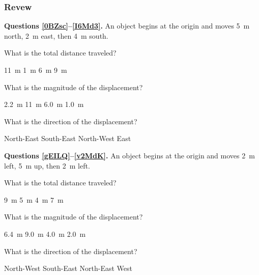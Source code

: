 \documentclass[]{exam}
\newcounter{reviewcounter}
\begin{document}
\clearpage

\subsubsection*{Revew \thereviewcounter}

\begin{questions}


\begin{EnvUplevel}
    \textbf{Questions \ref{0BZsc}--\ref{I6Md3}.} An object begins at the origin and moves \SI{5}{m} north, \SI{2}{m} east, then \SI{4}{m} south.
\end{EnvUplevel}


\question \label{0BZsc}
What is the total distance traveled?

\begin{randomizechoices}
    \correctchoice \SI{11}{m}
    \choice \SI{1}{m}
    \choice \SI{6}{m}
    \choice \SI{9}{m}
\end{randomizechoices}

\question
What is the magnitude of the displacement?

\begin{randomizechoices}
    \correctchoice \SI{2.2}{m}
    \choice \SI{11}{m}
    \choice \SI{6.0}{m}
    \choice \SI{1.0}{m}
\end{randomizechoices}

\question \label{I6Md3}
What is the direction of the displacement?

\begin{randomizechoices}
    \correctchoice North-East
    \choice South-East
    \choice North-West
    \choice East
\end{randomizechoices}

\begin{EnvUplevel}
    \textbf{Questions \ref{gEILQ}--\ref{v2MdK}.} An object begins at the origin and moves \SI{2}{m} left, \SI{5}{m} up, then \SI{2}{m} left.
\end{EnvUplevel}


\question \label{gEILQ}
What is the total distance traveled?
\begin{randomizechoices}
    \correctchoice \SI{9}{m}
    \choice \SI{5}{m}
    \choice \SI{4}{m}
    \choice \SI{7}{m}
\end{randomizechoices}

\question
What is the magnitude of the displacement?
\begin{randomizechoices}
    \correctchoice \SI{6.4}{m}
    \choice \SI{9.0}{m}
    \choice \SI{4.0}{m}
    \choice \SI{2.0}{m}
\end{randomizechoices}

\question \label{v2MdK}
What is the direction of the displacement?
\begin{randomizechoices}
    \correctchoice North-West
    \choice South-East
    \choice North-East
    \choice West
\end{randomizechoices}

\end{questions}
\end{document}
